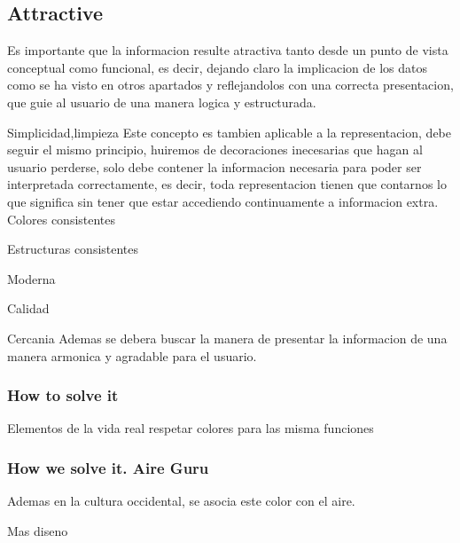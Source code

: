 \subsection{Attractive}
Es importante que la informacion resulte atractiva tanto desde un punto de vista conceptual
como funcional, es decir, dejando claro la implicacion de los datos como se ha visto en otros
apartados y reflejandolos con una correcta presentacion, que guie al usuario de una manera logica y estructurada.


Simplicidad,limpieza
Este concepto es tambien aplicable a la representacion, debe seguir el mismo principio, huiremos de decoraciones inecesarias que hagan al 
usuario perderse, solo debe contener la informacion necesaria para poder ser interpretada correctamente, es decir,
toda representacion tienen que contarnos lo que significa sin tener que estar accediendo continuamente a informacion
extra.
Colores consistentes

Estructuras consistentes

Moderna

Calidad

Cercania
Ademas se debera buscar la manera de presentar la informacion de una manera armonica y agradable para el usuario.

\subsubsection{How to solve it} 
Elementos de la vida real
respetar colores para las misma funciones
\subsubsection{How we solve it. Aire Guru} 
Ademas en la 
cultura occidental, se asocia este color con el aire.

\begin{itemize}
    \done
    \crossed
    \crossed Mas diseno
\end{itemize}
\newpage